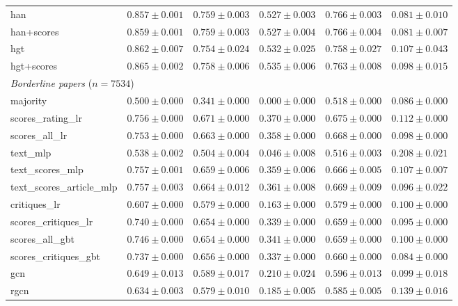 \begin{table}[t]
\begin{tabular}{lccccc}
han & $0.857 \pm 0.001$ & $0.759 \pm 0.003$ & $0.527 \pm 0.003$ & $0.766 \pm 0.003$ & $0.081 \pm 0.010$ \\
han+scores & $0.859 \pm 0.001$ & $0.759 \pm 0.003$ & $0.527 \pm 0.004$ & $0.766 \pm 0.004$ & $0.081 \pm 0.007$ \\
hgt & $0.862 \pm 0.007$ & $0.754 \pm 0.024$ & $0.532 \pm 0.025$ & $0.758 \pm 0.027$ & $0.107 \pm 0.043$ \\
hgt+scores & $0.865 \pm 0.002$ & $0.758 \pm 0.006$ & $0.535 \pm 0.006$ & $0.763 \pm 0.008$ & $0.098 \pm 0.015$ \\
\midrule
\multicolumn{6}{l}{\emph{Borderline papers} ($n = 7534$)} \\
majority & $0.500 \pm 0.000$ & $0.341 \pm 0.000$ & $0.000 \pm 0.000$ & $0.518 \pm 0.000$ & $0.086 \pm 0.000$ \\
scores\_rating\_lr & $0.756 \pm 0.000$ & $0.671 \pm 0.000$ & $0.370 \pm 0.000$ & $0.675 \pm 0.000$ & $0.112 \pm 0.000$ \\
scores\_all\_lr & $0.753 \pm 0.000$ & $0.663 \pm 0.000$ & $0.358 \pm 0.000$ & $0.668 \pm 0.000$ & $0.098 \pm 0.000$ \\
text\_mlp & $0.538 \pm 0.002$ & $0.504 \pm 0.004$ & $0.046 \pm 0.008$ & $0.516 \pm 0.003$ & $0.208 \pm 0.021$ \\
text\_scores\_mlp & $0.757 \pm 0.001$ & $0.659 \pm 0.006$ & $0.359 \pm 0.006$ & $0.666 \pm 0.005$ & $0.107 \pm 0.007$ \\
text\_scores\_article\_mlp & $0.757 \pm 0.003$ & $0.664 \pm 0.012$ & $0.361 \pm 0.008$ & $0.669 \pm 0.009$ & $0.096 \pm 0.022$ \\
critiques\_lr & $0.607 \pm 0.000$ & $0.579 \pm 0.000$ & $0.163 \pm 0.000$ & $0.579 \pm 0.000$ & $0.100 \pm 0.000$ \\
scores\_critiques\_lr & $0.740 \pm 0.000$ & $0.654 \pm 0.000$ & $0.339 \pm 0.000$ & $0.659 \pm 0.000$ & $0.095 \pm 0.000$ \\
scores\_all\_gbt & $0.746 \pm 0.000$ & $0.654 \pm 0.000$ & $0.341 \pm 0.000$ & $0.659 \pm 0.000$ & $0.100 \pm 0.000$ \\
scores\_critiques\_gbt & $0.737 \pm 0.000$ & $0.656 \pm 0.000$ & $0.337 \pm 0.000$ & $0.660 \pm 0.000$ & $0.084 \pm 0.000$ \\
gcn & $0.649 \pm 0.013$ & $0.589 \pm 0.017$ & $0.210 \pm 0.024$ & $0.596 \pm 0.013$ & $0.099 \pm 0.018$ \\
rgcn & $0.634 \pm 0.003$ & $0.579 \pm 0.010$ & $0.185 \pm 0.005$ & $0.585 \pm 0.005$ & $0.139 \pm 0.016$ \\

\end{tabular}
\end{table}
